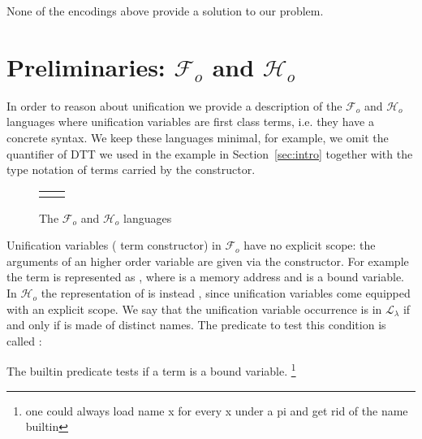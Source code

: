 \documentclass[sigconf,natbib=false,review]{acmart}
\newcommand{\llambda}{\ensuremath{\mathcal{L}_\lambda}\xspace}
\newcommand{\Fo}{\ensuremath{\mathcal{F}_{\!o}\xspace}} %
\newcommand{\Ho}{\ensuremath{\mathcal{H}_o}\xspace}
\begin{document}
None of the encodings above provide a solution to our problem.

\section{Preliminaries: \Fo{} and \Ho}
\label{sec:lang-spec}

In order to reason about unification we provide a description of the
\Fo{} and \Ho languages where unification variables
are first class terms, i.e. they have a concrete syntax. We keep these languages
minimal, for example, we omit the  quantifier of DTT we used
in the example in Section~\ref{sec:intro} together with the type notation of
terms carried by the  constructor.
%
\setlength{\abovecaptionskip}{0pt}
\setlength{\belowcaptionskip}{-13pt}

\begin{figure}[H]
  \begin{tabular}{ll}
  \begin{minipage}{0.21\textwidth}
   {code/fo_tm}
  \end{minipage}
  &
  \begin{minipage}{0.24\textwidth}
   {code/ho_tm}
  \end{minipage}
  \end{tabular}\vspace{4pt}
  \caption{The \Fo{} and \Ho languages}\vspace{0.3em}
  \label{code:common-terms}
\end{figure}

\noindent
Unification variables ( term constructor)
in \Fo{} have no explicit scope:
the arguments of an higher order variable are given via the 
constructor. For example the term  is represented as
, where  is a memory address and
 is a bound variable.\\
In \Ho the representation of  is instead ,
since unification variables come equipped with an explicit scope.
We say that the unification variable occurrence  is in
\llambda if and only if  is made of distinct names. The
predicate to test this condition is called :



\noindent
The  builtin predicate tests if a term is a bound variable.
\footnote{one could always load name x for every x under a pi and get rid of the name builtin}
\end{document}
